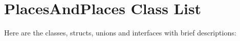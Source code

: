 \section{Places\-And\-Places Class List}
Here are the classes, structs, unions and interfaces with brief descriptions:\begin{CompactList}
\item{}
\end{CompactList}
